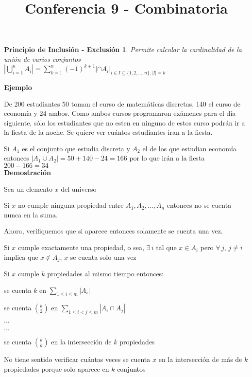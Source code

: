 \documentclass[a4paper,12pt]{report}
\title{Conferencia 9 - Combinatoria}
\author{}
\newtheorem*{pie}{Principio de Inclusión - Exclusión}
\begin{document}
\maketitle


\begin{pie}
Permite calcular la cardinalidad de la unión de varios conjuntos\\
 $|\bigcup^n_{i=1}A_i|=\sum^n_{k=1}(-1)^{k+1}|\cap A_i|_{i\in I\subseteq\{1,2,\dots,n\},|I|=k}$
\end{pie}

\textbf{Ejemplo}

De 200 estudiantes 50 toman el curso de matemáticas discretas, 140 el curso de economía y 24 ambos. Como ambos cursos programaron exámenes para el día siguiente, sólo los estudiantes que no esten en ninguno de estos curso podrán ir a la fiesta de la noche. Se quiere ver cuántos estudiantes iran a la fiesta.

Si $A_1$ es el conjunto que estudia discreta y $A_2$ el de los que estudian economía entonces $|A_1\cup A_2|=50+140-24=166$ por lo que irán a la fiesta $200-166=34$\\


\textbf{Demostración}

Sea un elemento $x$ del universo

Si $x$ no cumple ninguna propiedad entre $A_1,A_2,\dots,A_n$ entonces no se cuenta nunca en la suma.

Ahora, verifiquemos que si aparece entonces solamente se cuenta una vez.

Si $x$ cumple exactamente una propiedad, o sea, $\exists \, i$ tal que  $x\in A_i$ pero $\forall \, j$, $j\neq i$ implica que $x\not \in A_j$, $x$ se cuenta solo una vez

Si $x$ cumple $k$ propiedades al mismo tiempo entonces:

se cuenta $k$ en $\sum_{1\leq i \leq m}|A_i|$

se cuenta ${k}\choose{2}$ en $\sum_{1\leq i < j\leq m}|A_i\cap A_j|$

$\dots$

$\dots$

se cuenta ${k}\choose{k}$ en la intersección de $k$ propiedades

No tiene sentido verificar cuántas veces se cuenta $x$ en la intersección de más de $k$ propiedades porque solo aparece en $k$ conjuntos
\end{document}
